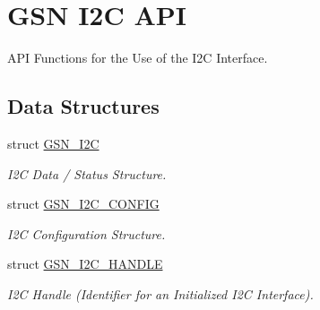 \hypertarget{a00649}{
\section{GSN I2C API}
\label{a00649}
}


API Functions for the Use of the I2C Interface.  


\subsection*{Data Structures}
\begin{DoxyCompactItemize}
\item 
struct \hyperlink{a00098}{GSN\_\-I2C}
\begin{DoxyCompactList}\small\item\em I2C Data / Status Structure. \end{DoxyCompactList}\item 
struct \hyperlink{a00099}{GSN\_\-I2C\_\-CONFIG}
\begin{DoxyCompactList}\small\item\em I2C Configuration Structure. \end{DoxyCompactList}\item 
struct \hyperlink{a00100}{GSN\_\-I2C\_\-HANDLE}
\begin{DoxyCompactList}\small\item\em I2C Handle (Identifier for an Initialized I2C Interface). \end{DoxyCompactList}\end{DoxyCompactItemize}
